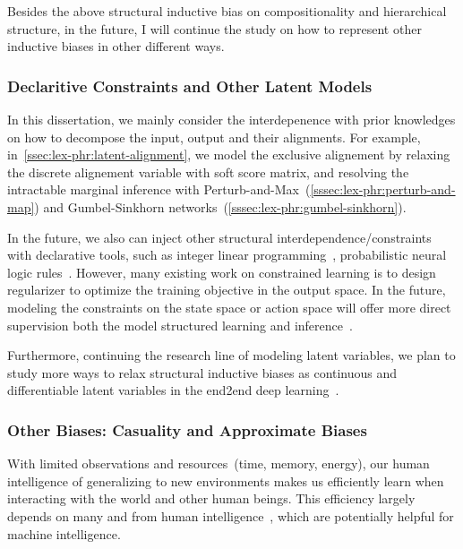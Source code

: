 Besides the above structural inductive bias on compositionality and
hierarchical structure, in the future, I will continue the study on how
to represent other inductive biases in other different ways.

\subsubsection{Declaritive Constraints and Other Latent Models}
\label{sssec:future:constraints}
In this dissertation, we mainly consider the interdepenence with prior
knowledges on how to decompose the input, output and their alignments.
For example, in~\autoref{ssec:lex-phr:latent-alignment}, we model the
exclusive alignement by relaxing the discrete alignement variable with
soft score matrix, and resolving the intractable marginal inference
with Perturb-and-Max~(\autoref{sssec:lex-phr:perturb-and-map}) and
Gumbel-Sinkhorn networks~(\autoref{sssec:lex-phr:gumbel-sinkhorn}).

In the future, we also can inject other structural
interdependence/constraints with declarative tools, such as integer
linear programming~\citep{roth2007global}, probabilistic neural logic
rules~\citep{bach2017hinge,li2019augmenting,pacheco2021modeling,marra2019integrating}.
However, many existing work on constrained learning is to design
regularizer to optimize the training objective in the output space.
In the future, modeling the constraints on the state space or action
space will offer more direct supervision both the model structured learning and
inference~\cite{lu-etal-2022-neurologic}.

Furthermore, continuing the research line of modeling latent
variables, we plan to study more ways to relax structural inductive
biases as continuous and differentiable latent variables in the
end2end deep learning~\citep{yin2018structvae, corro2019learning}.

\subsubsection{Other Biases: Casuality and Approximate Biases}
\label{sssec:future:approx-biases}
With limited observations and resources~(time, memory, energy), our
human intelligence of generalizing to new environments makes us
efficiently learn when interacting with the world and other human
beings. This efficiency largely depends on many 
and  from human
intelligence~\cite{Gershman2021WhatMU}, which are potentially helpful
for machine intelligence.


